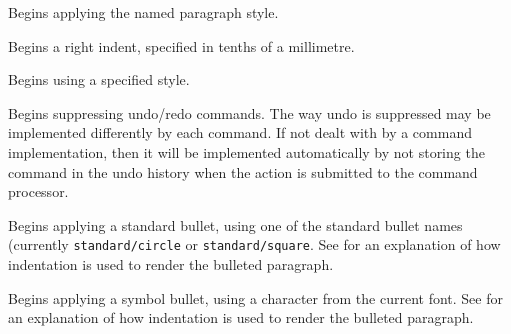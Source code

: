 Begins applying the named paragraph style.

\label{wxrichtextbufferbeginrightindent}


Begins a right indent, specified in tenths of a millimetre.

\label{wxrichtextbufferbeginstyle}


Begins using a specified style.

\label{wxrichtextbufferbeginsuppressundo}


Begins suppressing undo/redo commands. The way undo is suppressed may be implemented
differently by each command. If not dealt with by a command implementation, then
it will be implemented automatically by not storing the command in the undo history
when the action is submitted to the command processor.

\label{wxrichtextbufferbeginstandardbullet}


Begins applying a standard bullet, using one of the standard bullet names (currently {\tt standard/circle} or {\tt standard/square}.
See  for an explanation of how indentation is used to render the bulleted paragraph.

\label{wxrichtextbufferbeginsymbolbullet}


Begins applying a symbol bullet, using a character from the current font. See  for
an explanation of how indentation is used to render the bulleted paragraph.

\label{wxrichtextbufferbegintextcolour}

